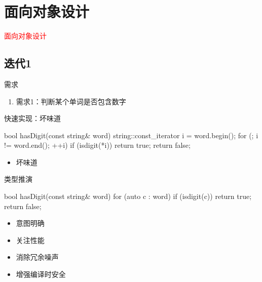\section{面向对象设计}
\label{sec:oodesign}

\begin{frame}
  \begin{center}
    \Huge{\textcolor{red}{面向对象设计}}
  \end{center}
\end{frame}

\subsection{迭代1}

\begin{frame}{需求}
  \begin{block}{}
    \begin{enumerate}
      \item<alert@1-> 需求1：判断某个单词是否包含数字
    \end{enumerate}
  \end{block}
\end{frame}

\begin{frame}[fragile]{快速实现：坏味道}
  \begin{c++}
  bool hasDigit(const string& word) {
    string::const_iterator i = word.begin();
    for (; i != word.end(); ++i)
      if (isdigit(*i))
        return true;
    return false;
  }
  \end{c++}

  \begin{itemize}
    \item \alert{坏味道}
  \end{itemize} 
\end{frame}

\begin{frame}[fragile]{类型推演}
  \begin{c++}
  bool hasDigit(const string& word) {
    for (auto c : word)
      if (isdigit(c))
        return true;
    return false;
  }
  \end{c++}

  \begin{itemize}
    \item \alert{意图明确}
    \item \alert{关注性能}
    \item \alert{消除冗余噪声}
    \item \alert{增强编译时安全}
  \end{itemize}
\end{frame}

